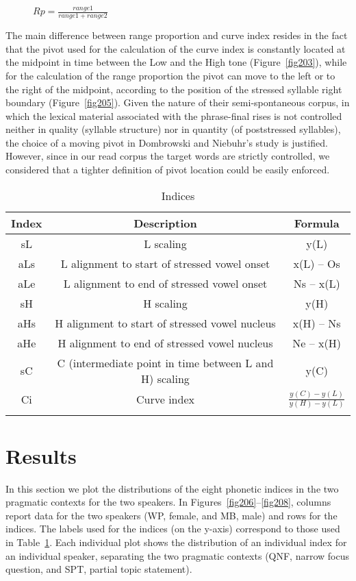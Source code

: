 \begin{description}
   \item[] \(Rp=\frac{range1}{range1+range2}\)
\end{description}

The main difference between range proportion and curve index resides in the fact that the pivot used for the calculation of the curve index is constantly located at the midpoint in time between the Low and the High tone (Figure~\ref{fig203}), while for the calculation of the range proportion the pivot can move to the left or to the right of the midpoint, according to the position of the stressed syllable right boundary (Figure~\ref{fig205}). Given the nature of their semi-spontaneous corpus, in which the lexical material associated with the phrase-final rises is not controlled neither in quality (syllable structure) nor in quantity (of poststressed syllables), the choice of a moving pivot in Dombrowski and Niebuhr's study is justified. However, since in our read corpus the target words are strictly controlled, we considered that a tighter definition of pivot location could be easily enforced.

\begin{table}[h]
\centering
\resizebox{\linewidth}{!} {
\begin{tabular}{c c c}
\mytoprule
Index & Description & Formula \\
\midrule
sL & L scaling & y(L) \\
aLs	& L alignment to start of stressed vowel onset & x(L) – Os \\
aLe	& L alignment to end of stressed vowel onset & Ns – x(L) \\
sH	& H scaling	& y(H) \\
aHs	& H alignment to start of stressed vowel nucleus & x(H) – Ns \\
aHe	& H alignment to end of stressed vowel nucleus & Ne – x(H) \\
sC	& C (intermediate point in time between L and H) scaling & y(C) \\
Ci	& Curve index & \(\frac{y(C)-y(L)}{y(H)-y(L)}\) \\
\mybottomrule
\end{tabular}
}
\caption{Indices}
\label{tab21}\end{table}

\section{Results}\label{sec23}
In this section we plot the distributions of the eight phonetic indices in the two pragmatic contexts for the two speakers. In Figures~\ref{fig206}--\ref{fig208}, columns report data for the two speakers (WP, female, and MB, male) and rows for the indices. The labels used for the indices (on the y-axis) correspond to those used in Table~\ref{tab21}. Each individual plot shows the distribution of an individual index for an individual speaker, separating the two pragmatic contexts (QNF, narrow focus question, and SPT, partial topic statement).

